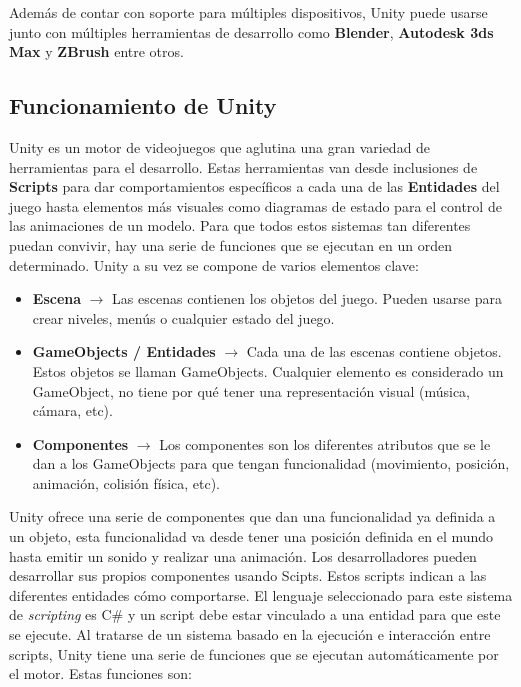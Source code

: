 Adem\'as de contar con soporte para m\'ultiples dispositivos, Unity puede usarse junto con m\'ultiples herramientas de desarrollo como \textbf{Blender}, \textbf{Autodesk 3ds Max} y \textbf{ZBrush} entre otros.

\subsection {Funcionamiento de Unity}

Unity es un motor de videojuegos que aglutina una gran variedad de herramientas para el desarrollo. Estas herramientas van desde inclusiones de \textbf{Scripts} para dar comportamientos espec\'ificos a cada una de las \textbf{Entidades} del juego hasta elementos m\'as visuales como diagramas de estado para el control de las animaciones de un modelo. Para que todos estos sistemas tan diferentes puedan convivir, hay una serie de funciones que se ejecutan en un orden determinado. Unity a su vez se compone de varios elementos clave:

\begin {itemize}
\item \textbf{Escena} $\rightarrow$  Las escenas contienen los objetos del juego. Pueden usarse para crear niveles, men\'us o cualquier estado del juego.
\item \textbf{GameObjects / Entidades} $\rightarrow$ Cada una de las escenas contiene objetos. Estos objetos se llaman GameObjects. Cualquier elemento es considerado un GameObject, no tiene por qu\'e tener una representaci\'on visual (m\'usica, c\'amara, etc).
\item \textbf{Componentes} $\rightarrow$ Los componentes son los diferentes atributos que se le dan a los GameObjects para que tengan funcionalidad (movimiento, posici\'on, animaci\'on, colisi\'on f\'isica, etc).
\end {itemize}

Unity ofrece una serie de componentes que dan una funcionalidad ya definida a un objeto, esta funcionalidad va desde tener una posici\'on definida en el mundo hasta emitir un sonido y realizar una animaci\'on. Los desarrolladores pueden desarrollar sus propios componentes usando Scipts. Estos scripts indican a las diferentes entidades c\'omo comportarse. El lenguaje seleccionado para este sistema de \textit{scripting} es C\# y un script debe estar vinculado a una entidad para que este se ejecute. Al tratarse de un sistema basado en la ejecuci\'on e interacci\'on entre scripts, Unity tiene una serie de funciones que se ejecutan autom\'aticamente por el motor. Estas funciones son:

